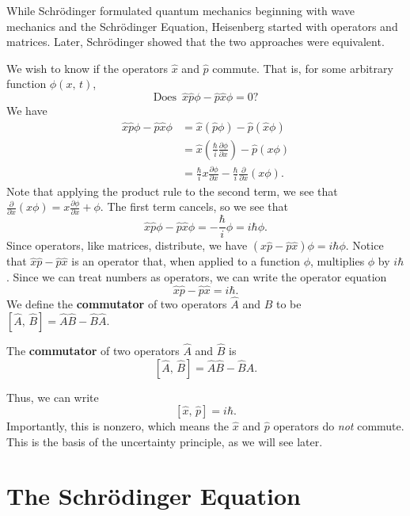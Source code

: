 \begin{framedrmk*}
    While Schrödinger formulated quantum mechanics beginning with wave mechanics and the Schrödinger Equation, Heisenberg started with operators and matrices. Later, Schrödinger showed that the two approaches were equivalent.
\end{framedrmk*}

We wish to know if the operators $\hat{x}$ and $\hat{p}$ commute. That is, for some arbitrary function $\phi(x,\,t)$, $$\text{Does}\;\ \hat{x}\hat{p}\phi-\hat{p}\hat{x}\phi=0?$$We have \begin{align*}
\hat{x}\hat{p}\phi-\hat{p}\hat{x}\phi&=\hat{x}(\hat{p}\phi)-\hat{p}(\hat{x}\phi)\\&=\hat{x}(\frac{\hbar}{i}\frac{\partial \phi}{\partial x})-\hat{p}(x\phi)\\&=\frac{\hbar}{i}x\frac{\partial\phi}{\partial x}-\frac{\hbar}{i}\frac{\partial}{\partial x}(x\phi).
\end{align*}Note that applying the product rule to the second term, we see that $\frac{\partial}{\partial x}(x\phi)=x\frac{\partial\phi}{\partial x}+\phi$.  The first term cancels, so we see that $$\hat{x}\hat{p}\phi-\hat{p}\hat{x}\phi=-\frac{\hbar}{i}\phi=i\hbar\phi.$$Since operators, like matrices, distribute, we have $(\hat{x}\hat{p}-\hat{p}\hat{x})\phi=i\hbar\phi$. Notice that $\hat{x}\hat{p}-\hat{p}\hat{x}$ is an operator that, when applied to a function $\phi$, multiplies $\phi$ by $i\hbar$. Since we can treat numbers as operators, we can write the operator equation $$\hat{x}\hat{p}-\hat{p}\hat{x}=i\hbar.$$We define the \textbf{commutator} of two operators $\hat{A}$ and $\hat{B}$ to be $[\hat{A},\,\hat{B}]=\hat{A}\hat{B}-\hat{B}\hat{A}.$

\begin{frameddefn}[Commutator]
    The \textbf{commutator} of two operators $\hat{A}$ and $\hat{B}$ is $$[\hat{A},\,\hat{B}]=\hat{A}\hat{B}-\hat{B}\hat{A}.$$
\end{frameddefn}

Thus, we can write $$[\hat{x},\,\hat{p}]=i\hbar.$$
Importantly, this is nonzero, which means the $\hat{x}$ and $\hat{p}$ operators do \textit{not} commute. This is the basis of the uncertainty principle, as we will see later.

\section{The Schrödinger Equation}\label{schrodinger_main}

